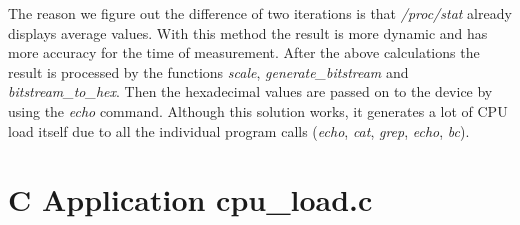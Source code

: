 The reason we figure out the difference of two iterations is that \textit{/proc/stat} already displays average values. With this method the result is more dynamic and has more accuracy for the time of measurement. After the above calculations the result is processed by the functions \textit{scale}, \textit{generate\_bitstream} and \textit{bitstream\_to\_hex}. Then the hexadecimal values are passed on to the device by using the \textit{echo} command. Although this solution works, it generates a lot of CPU load itself due to all the individual program calls (\textit{echo}, \textit{cat}, \textit{grep}, \textit{echo}, \textit{bc}).



\section{C Application cpu\_load.c}


